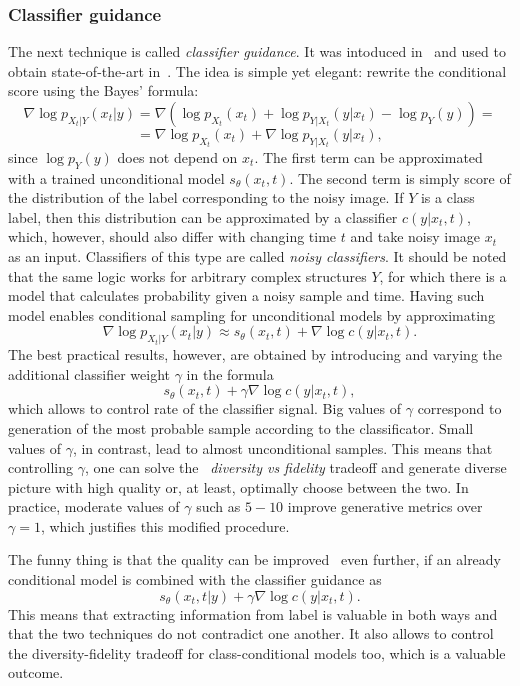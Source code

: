 \subsubsection{Classifier guidance}
The next technique is called \emph{classifier guidance}. It was intoduced in~\cite{song2020score} and used to obtain state-of-the-art in~\cite{dhariwal2021diffusion}. The idea is simple yet elegant: rewrite the conditional score using the Bayes' formula:
\[
    \nabla \log p_{X_t | Y}(x_t | y) = \nabla \left(\log p_{X_t}(x_t) + \log p_{Y | X_t}(y | x_t) - \log p_{Y}(y)\right) =
\]
\[
    = \nabla \log p_{X_t}(x_t) + \nabla \log p_{Y | X_t}(y | x_t),
\]
since $\log p_{Y}(y)$ does not depend on $x_t$. The first term can be approximated with a trained unconditional model $s_\theta(x_t, t)$. The second term is simply score of the distribution of the label corresponding to the noisy image. If $Y$ is a class label, then this distribution can be approximated by a classifier $c(y | x_t, t)$, which, however, should also differ with changing time $t$ and take noisy image $x_t$ as an input. Classifiers of this type are called \emph{noisy classifiers}. It should be noted that the same logic works for arbitrary complex structures $Y$, for which there is a model that calculates probability given a noisy sample and time. Having such model enables conditional sampling for unconditional models by approximating
\[
    \nabla \log p_{X_t | Y}(x_t | y) \approx s_\theta(x_t, t) + \nabla \log c(y | x_t, t).
\]
The best practical results, however, are obtained by introducing and varying the additional classifier weight $\gamma$ in the formula
\[
    s_\theta(x_t, t) + \gamma \nabla \log c(y | x_t, t),
\]
which allows to control rate of the classifier signal. Big values of $\gamma$ correspond to generation of the most probable sample according to the classificator. Small values of $\gamma$, in contrast, lead to almost unconditional samples. This means that controlling $\gamma$, one can solve the ~\emph{diversity vs fidelity} tradeoff and generate diverse picture with high quality or, at least, optimally choose between the two. In practice, moderate values of $\gamma$ such as $5-10$ improve generative metrics over $\gamma=1$, which justifies this modified procedure. 

The funny thing is that the quality can be improved~\cite{dhariwal2021diffusion} even further, if an already conditional model is combined with the classifier guidance as
\[
    s_\theta(x_t, t | y) + \gamma \nabla \log c(y | x_t, t).
\]
This means that extracting information from label is valuable in both ways and that the two techniques do not contradict one another. It also allows to control the diversity-fidelity tradeoff for class-conditional models too, which is a valuable outcome.

